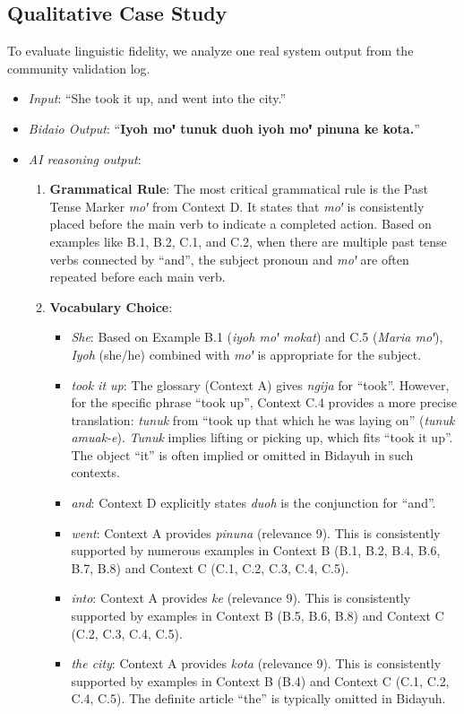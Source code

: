 \documentclass[12pt]{article}
\begin{document}
\subsection{Qualitative Case Study}
To evaluate linguistic fidelity, we analyze one real system output from the community validation log.

    \begin{itemize}[leftmargin=10pt]
        \item \textit{Input}: ``She took it up, and went into the city.''
            \item \textit{Bidaio Output}: ``\textbf{Iyoh moꞌ tunuk duoh iyoh moꞌ pinuna ke kota.}''
        \item \textit{AI reasoning output}:
    \begin{enumerate}[leftmargin=10pt]
        \item \textbf{Grammatical Rule}: The most critical grammatical rule is the Past Tense Marker \emph{moꞌ} from Context D. It states that \emph{moꞌ} is consistently placed before the main verb to indicate a completed action. Based on examples like B.1, B.2, C.1, and C.2, when there are multiple past tense verbs connected by ``and'', the subject pronoun and \emph{moꞌ} are often repeated before each main verb.
        
        \item \textbf{Vocabulary Choice}:
        \begin{itemize}[leftmargin=10pt]
            \item \textit{She}: Based on Example B.1 (\emph{iyoh moꞌ mokat}) and C.5 (\emph{Maria moꞌ}), \emph{Iyoh} (she/he) combined with \emph{moꞌ} is appropriate for the subject.
            \item \textit{took it up}: The glossary (Context A) gives \emph{ngija} for ``took''. However, for the specific phrase ``took up'', Context C.4 provides a more precise translation: \emph{tunuk} from ``took up that which he was laying on'' (\emph{tunuk amuak-e}). \emph{Tunuk} implies lifting or picking up, which fits ``took it up''. The object ``it'' is often implied or omitted in Bidayuh in such contexts.
            \item \textit{and}: Context D explicitly states \emph{duoh} is the conjunction for ``and''.
            \item \textit{went}: Context A provides \emph{pinuna} (relevance 9). This is consistently supported by numerous examples in Context B (B.1, B.2, B.4, B.6, B.7, B.8) and Context C (C.1, C.2, C.3, C.4, C.5).
            \item \textit{into}: Context A provides \emph{ke} (relevance 9). This is consistently supported by examples in Context B (B.5, B.6, B.8) and Context C (C.2, C.3, C.4, C.5).
            \item \textit{the city}: Context A provides \emph{kota} (relevance 9). This is consistently supported by examples in Context B (B.4) and Context C (C.1, C.2, C.4, C.5). The definite article ``the'' is typically omitted in Bidayuh.
        \end{itemize}
        

\end{enumerate}
\end{itemize}
\end{document}
